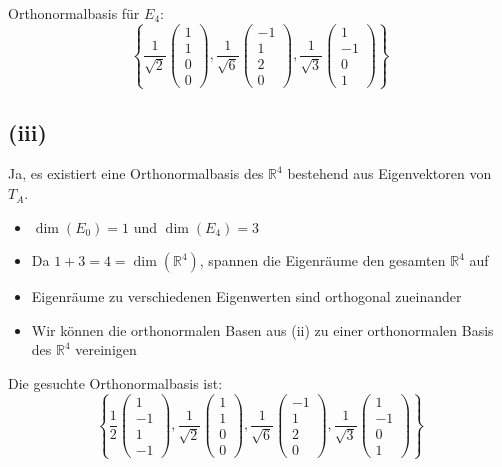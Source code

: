 \documentclass{article}
\begin{document}
Orthonormalbasis für $E_4$:
$$\left\{\frac{1}{\sqrt{2}}\begin{pmatrix} 1 \\ 1 \\ 0 \\ 0 \end{pmatrix}, \frac{1}{\sqrt{6}}\begin{pmatrix} -1 \\ 1 \\ 2 \\ 0 \end{pmatrix}, \frac{1}{\sqrt{3}}\begin{pmatrix} 1 \\ -1 \\ 0 \\ 1 \end{pmatrix}\right\}$$

\subsection*{(iii)}

Ja, es existiert eine Orthonormalbasis des $\mathbb{R}^4$ bestehend aus Eigenvektoren von $T_A$.

\begin{itemize}
\item $\dim(E_0) = 1$ und $\dim(E_4) = 3$
\item Da $1 + 3 = 4 = \dim(\mathbb{R}^4)$, spannen die Eigenräume den gesamten $\mathbb{R}^4$ auf
\item Eigenräume zu verschiedenen Eigenwerten sind orthogonal zueinander
\item Wir können die orthonormalen Basen aus (ii) zu einer orthonormalen Basis des $\mathbb{R}^4$ vereinigen
\end{itemize}

Die gesuchte Orthonormalbasis ist:
$$\left\{\frac{1}{2}\begin{pmatrix} 1 \\ -1 \\ 1 \\ -1 \end{pmatrix}, \frac{1}{\sqrt{2}}\begin{pmatrix} 1 \\ 1 \\ 0 \\ 0 \end{pmatrix}, \frac{1}{\sqrt{6}}\begin{pmatrix} -1 \\ 1 \\ 2 \\ 0 \end{pmatrix}, \frac{1}{\sqrt{3}}\begin{pmatrix} 1 \\ -1 \\ 0 \\ 1 \end{pmatrix}\right\}$$
\end{document}
